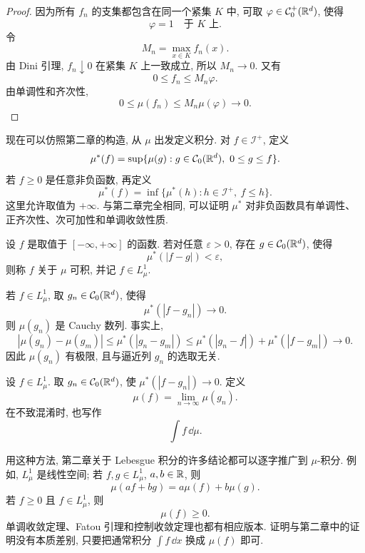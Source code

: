 \begin{proof}
	因为所有 \(f_n\) 的支集都包含在同一个紧集 \(K\) 中, 可取 \(\varphi\in\mathcal{C}_0^+(\mathbb{R}^d)\), 使得
	\[
	\varphi=1\quad\text{于 }K\text{ 上}.
	\]
	令
	\[
	M_n=\max_{x\in K} f_n(x).
	\]
	由 Dini 引理, \(f_n\downarrow0\) 在紧集 \(K\) 上一致成立, 所以 \(M_n\to0\). 又有
	\[
	0\leq f_n\leq M_n\varphi.
	\]
	由单调性和齐次性,
	\[
	0\leq\mu(f_n)\leq M_n\mu(\varphi)\to0.
	\]
\end{proof}

现在可以仿照第二章的构造, 从 \(\mu\) 出发定义积分. 对 \(f\in\mathcal I^+\), 定义
\begin{equation}
	\mu^*(f)=\sup\{\mu(g):g\in\C_0(\R^d),\ 0\leq g\leq f\}.
	\label{eq:mu-star-on-i-plus}
\end{equation}
若 \(f\geq0\) 是任意非负函数, 再定义
\begin{equation}
	\mu^*(f)=\inf\{\mu^*(h):h\in\mathcal I^+,\ f\leq h\}.
	\label{eq:mu-star-positive-function}
\end{equation}
这里允许取值为 \(+\infty\). 与第二章完全相同, 可以证明 \(\mu^*\) 对非负函数具有单调性、正齐次性、次可加性和单调收敛性质.

\begin{defn}[关于 \(\mu\) 的可积函数]
	\label{def:l1-mu}
	设 \(f\) 是取值于 \([-\infty,+\infty]\) 的函数. 若对任意 \(\varepsilon>0\), 存在 \(g\in\mathcal{C}_0(\mathbb{R}^d)\), 使得
	\[
	\mu^*(|f-g|)<\varepsilon,
	\]
	则称 \(f\) 关于 \(\mu\) 可积, 并记 \(f\in L^1_\mu\).
\end{defn}

若 \(f\in L^1_\mu\), 取 \(g_n\in\mathcal{C}_0(\mathbb{R}^d)\), 使得
\[
\mu^*(|f-g_n|)\to0.
\]
则 \(\mu(g_n)\) 是 Cauchy 数列. 事实上,
\[
|\mu(g_n)-\mu(g_m)|
\leq \mu^*(|g_n-g_m|)
\leq \mu^*(|g_n-f|)+\mu^*(|f-g_m|)\to0.
\]
因此 \(\mu(g_n)\) 有极限, 且与逼近列 \(g_n\) 的选取无关.

\begin{defn}[关于 \(\mu\) 的积分]
	\label{def:integral-with-respect-to-mu}
	设 \(f\in L^1_\mu\). 取 \(g_n\in\mathcal{C}_0(\mathbb{R}^d)\), 使 \(\mu^*(|f-g_n|)\to0\). 定义
	\[
	\mu(f)=\lim_{n\to\infty}\mu(g_n).
	\]
	在不致混淆时, 也写作
	\[
	\int f\,\dd\mu.
	\]
\end{defn}

用这种方法, 第二章关于 Lebesgue 积分的许多结论都可以逐字推广到 \(\mu\)-积分. 例如, \(L^1_\mu\) 是线性空间; 若 \(f,g\in L^1_\mu\), \(a,b\in\mathbb{R}\), 则
\[
\mu(af+bg)=a\mu(f)+b\mu(g).
\]
若 \(f\geq0\) 且 \(f\in L^1_\mu\), 则
\[
\mu(f)\geq0.
\]
单调收敛定理、Fatou 引理和控制收敛定理也都有相应版本. 证明与第二章中的证明没有本质差别, 只要把通常积分 \(\int f\,\dd x\) 换成 \(\mu(f)\) 即可.

